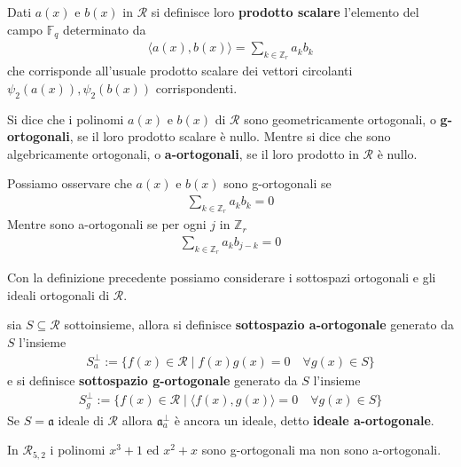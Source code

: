 \begin{definizione}
   Dati $a(x)$ e $b(x)$ in $\mathcal{R}$ si definisce loro {\bf prodotto scalare} l'elemento del campo $\mathbb{F}_{q}$ determinato da
   \begin{align*}
      \langle a(x), b(x) \rangle = \sum_{k \in \mathbb{Z}_{r} } a_{k}b_{k}
   \end{align*}
   che corrisponde all'usuale prodotto scalare dei vettori circolanti  $\psi_{2}(a(x)), \psi_{2}(b(x))$ corrispondenti.
\end{definizione}
\begin{definizione}
   Si dice che i polinomi $a(x)$ e $b(x)$ di $\mathcal{R}$ sono geometricamente ortogonali, o {\bf g-ortogonali}, se il loro prodotto scalare è nullo.
   Mentre si dice che sono algebricamente ortogonali, o {\bf a-ortogonali}, se il loro prodotto in $\mathcal{R}$ è nullo.
\end{definizione}
\begin{osservazione} \label{oss:aOrtogonali}
   Possiamo osservare che $a(x)$ e $b(x)$ sono g-ortogonali se
   \begin{align*}
      \sum_{k \in \mathbb{Z}_{r} } a_{k}b_{k} = 0
   \end{align*}
   Mentre sono a-ortogonali se per ogni $j$ in $\mathbb{Z}_{r}$
   \begin{align*}
      \sum_{k \in \mathbb{Z}_{r}} a_{k}b_{j-k} = 0
   \end{align*}
\end{osservazione}

Con la definizione precedente possiamo considerare i sottospazi ortogonali e gli ideali ortogonali di $\mathcal{R}$.
\begin{definizione}
   sia $S\subseteq \mathcal{R}$ sottoinsieme, allora si definisce {\bf sottospazio a-ortogonale} generato da $S$ l'insieme
   \begin{align*}
      S_{a}^{\perp} := \lbrace f(x) \in \mathcal{R} \mid f(x)g(x) = 0 \quad \forall g(x) \in S \rbrace
   \end{align*}
   e si definisce {\bf sottospazio g-ortogonale} generato da $S$ l'insieme
   \begin{align*}
      S_{g}^{\perp} := \lbrace f(x) \in \mathcal{R} \mid \langle f(x), g(x)\rangle = 0 \quad \forall g(x) \in S \rbrace
   \end{align*}
   Se $S = \mathfrak{a}$ ideale di $\mathcal{R}$ allora $\mathfrak{a}_{a}^{\perp}$ è ancora un ideale, detto {\bf ideale a-ortogonale}.
\end{definizione}
\begin{esempio} \label{ese:ortogonali1}
   In  $\mathcal{R}_{5,2}$ i polinomi $x^3 + 1$ ed $x^2+x$ sono g-ortogonali ma non sono a-ortogonali.
\end{esempio}

